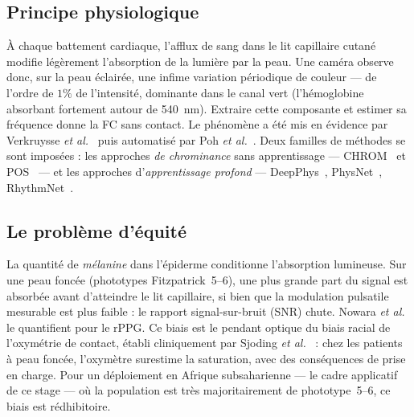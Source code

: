 \documentclass[11pt]{article}
\begin{document}
\subsection{Principe physiologique}
À chaque battement cardiaque, l'afflux de sang dans le lit capillaire cutané modifie
légèrement l'absorption de la lumière par la peau. Une caméra observe donc, sur la
peau éclairée, une infime variation périodique de couleur --- de l'ordre de $1\%$ de
l'intensité, dominante dans le canal vert (l'hémoglobine absorbant fortement autour
de 540~nm). Extraire cette composante et estimer sa fréquence donne la FC sans
contact. Le phénomène a été mis en évidence par Verkruysse
\emph{et al.}~\cite{verkruysse2008} puis automatisé par Poh \emph{et
al.}~\cite{poh2010}. Deux familles de méthodes se sont imposées : les approches
\emph{de chrominance} sans apprentissage --- CHROM~\cite{dehaan2013} et
POS~\cite{wang2017} --- et les approches d'\emph{apprentissage profond} ---
DeepPhys~\cite{chen2018}, PhysNet~\cite{yu2019}, RhythmNet~\cite{niu2020}.

\subsection{Le problème d'équité}
La quantité de \emph{mélanine} dans l'épiderme conditionne l'absorption lumineuse.
Sur une peau foncée (phototypes Fitzpatrick~5--6), une plus grande part du signal est
absorbée avant d'atteindre le lit capillaire, si bien que la modulation pulsatile
mesurable est plus faible : le rapport signal-sur-bruit (SNR) chute. Nowara
\emph{et al.}~\cite{nowara2020} le quantifient pour le rPPG. Ce biais est le pendant
optique du biais racial de l'oxymétrie de contact, établi cliniquement par Sjoding
\emph{et al.}~\cite{sjoding2020} : chez les patients à peau foncée, l'oxymètre
surestime la saturation, avec des conséquences de prise en charge. Pour un
déploiement en Afrique subsaharienne --- le cadre applicatif de ce stage --- où la
population est très majoritairement de phototype~5--6, ce biais est rédhibitoire.
\end{document}

